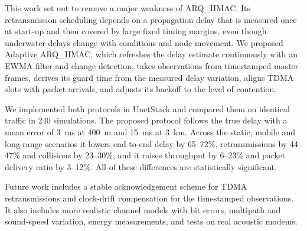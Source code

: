 \documentclass{article}
\begin{document}
This work set out to remove a major weakness of ARQ\_HMAC. Its retransmission scheduling depends on a propagation delay that is measured once at start-up and then covered by large fixed timing margins, even though underwater delays change with conditions and node movement. We proposed Adaptive ARQ\_HMAC, which refreshes the delay estimate continuously with an EWMA filter and change detection, takes observations from timestamped master frames, derives its guard time from the measured delay variation, aligns TDMA slots with packet arrivals, and adjusts its backoff to the level of contention.

We implemented both protocols in UnetStack and compared them on identical traffic in 240 simulations. The proposed protocol follows the true delay with a mean error of 3~ms at 400~m and 15~ms at 3~km. Across the static, mobile and long-range scenarios it lowers end-to-end delay by 65--72\%, retransmissions by 44--47\% and collisions by 23--30\%, and it raises throughput by 6--23\% and packet delivery ratio by 3--12\%. All of these differences are statistically significant.

Future work includes a stable acknowledgement scheme for TDMA retransmissions and clock-drift compensation for the timestamped observations. It also includes more realistic channel models with bit errors, multipath and sound-speed variation, energy measurements, and tests on real acoustic modems.
\end{document}
